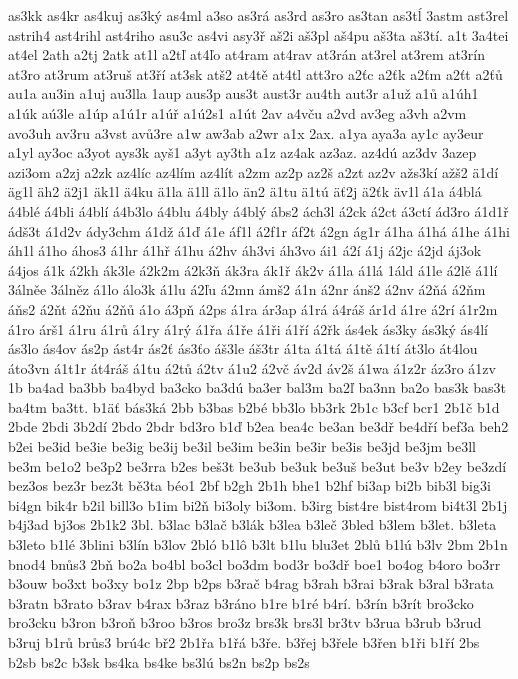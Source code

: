 {as3kk
as4kr
as4kuj
as3ký
as4ml
a3so
as3rá
as3rd
as3ro
as3tan
as3tĺ
3astm
ast3rel
astrih4
ast4rihl
ast4riho
asu3c
as4vi
asy3ř
aš2i
aš3pl
aš4pu
aš3ta
aš3tí.
a1t
3a4tei
at4el
2ath
a2tj
2atk
at1l
a2tľ
at4ľo
at4ram
at4rav
at3rán
at3rel
at3rem
at3rín
at3ro
at3rum
at3ruš
at3ří
at3sk
atš2
at4tě
at4tl
att3ro
a2ťc
a2ťk
a2ťm
a2ťt
a2ťů
au1a
au3in
a1uj
au3lla
1aup
aus3p
aus3t
aust3r
au4th
aut3r
a1už
a1ů
a1úh1
a1úk
aú3le
a1úp
a1ú1r
a1úř
a1ú2s1
a1út
2av
a4vču
a2vd
av3eg
a3vh
a2vm
avo3uh
av3ru
a3vst
avů3re
a1w
aw3ab
a2wr
a1x
2ax.
a1ya
aya3a
ay1c
ay3eur
a1yl
ay3oc
a3yot
ays3k
ayš1
a3yt
ay3th
a1z
az4ak
az3az.
az4dú
az3dv
3azep
azi3om
a2zj
a2zk
az4líc
az4lím
az4lít
a2zm
az2p
az2š
a2zt
az2v
ažs3kí
ažš2
ä1dí
äg1l
äh2
ä2j1
äk1l
ä4ku
ä1la
ä1ll
ä1lo
än2
ä1tu
ä1tú
äť2j
ä2ťk
äv1l
á1a
á4blá
á4blé
á4bli
á4blí
á4b3lo
á4blu
á4bly
á4blý
ábs2
ách3l
á2ck
á2ct
á3ctí
ád3ro
á1d1ř
ádš3t
á1d2v
ády3chm
á1dž
á1ď
á1e
áf1l
á2f1r
áf2t
á2gn
ág1r
á1ha
á1há
á1he
á1hi
áh1l
á1ho
áhos3
á1hr
á1hř
á1hu
á2hv
áh3vi
áh3vo
ái1
á2í
á1j
á2jc
á2jd
áj3ok
á4jos
á1k
á2kh
ák3le
á2k2m
á2k3ň
ák3ra
ák1ř
ák2v
á1la
á1lá
1áld
á1le
á2lě
á1lí
3álněe
3álněz
á1lo
álo3k
á1lu
á2ľu
á2mn
ámš2
á1n
á2nr
ánš2
á2nv
á2ňá
á2ňm
áňs2
á2ňt
á2ňu
á2ňů
á1o
á3pň
á2ps
á1ra
ár3ap
á1rá
á4ráš
ár1d
á1re
á2rí
á1r2m
á1ro
árš1
á1ru
á1rů
á1ry
á1rý
á1řa
á1ře
á1ři
á1ří
á2řk
ás4ek
ás3ky
ás3ký
ás4lí
ás3lo
ás4ov
ás2p
ást4r
ás2ť
ás3ťo
áš3le
áš3tr
á1ta
á1tá
á1tě
á1tí
át3lo
át4lou
áto3vn
á1t1r
át4ráš
á1tu
á2tů
á2tv
á1u2
á2vč
áv2d
áv2š
á1wa
á1z2r
áz3ro
á1zv
1b
ba4ad
ba3bb
ba4byd
ba3cko
ba3dú
ba3er
bal3m
ba2ľ
ba3nn
ba2o
bas3k
bas3t
ba4tm
ba3tt.
b1äť
bás3ká
2bb
b3bas
b2bé
bb3lo
bb3rk
2b1c
b3cf
bcr1
2b1č
b1d
2bde
2bdi
3b2dí
2bdo
2bdr
bd3ro
b1ď
b2ea
bea4c
be3an
be3dř
be4dří
bef3a
beh2
b2ei
be3id
be3ie
be3ig
be3ij
be3il
be3im
be3in
be3ir
be3is
be3jd
be3jm
be3ll
be3m
be1o2
be3p2
be3rra
b2es
beš3t
be3ub
be3uk
be3uš
be3ut
be3v
b2ey
be3zdí
bez3os
bez3r
bez3t
bě3ta
béo1
2bf
b2gh
2b1h
bhe1
b2hf
bi3ap
bi2b
bib3l
big3i
bi4gn
bik4r
b2il
bill3o
b1im
bi2ň
bi3oly
bi3om.
b3irg
bist4re
bist4rom
bi4t3l
2b1j
b4j3ad
bj3os
2b1k2
3bl.
b3lac
b3lač
b3lák
b3lea
b3leč
3bled
b3lem
b3let.
b3leta
b3leto
b1lé
3blini
b3lín
b3lov
2bló
b1lô
b3lt
b1lu
blu3et
2blů
b1lú
b3lv
2bm
2b1n
bnod4
bnůs3
2bň
bo2a
bo4bl
bo3cl
bo3dm
bod3r
bo3dř
boe1
bo4og
b4oro
bo3rr
b3ouw
bo3xt
bo3xy
bo1z
2bp
b2ps
b3rač
b4rag
b3rah
b3rai
b3rak
b3ral
b3rata
b3ratn
b3rato
b3rav
b4rax
b3raz
b3ráno
b1re
b1ré
b4rí.
b3rín
b3rít
bro3cko
bro3cku
b3ron
b3roň
b3roo
b3ros
bro3z
brs3k
brs3l
br3tv
b3rua
b3rub
b3rud
b3ruj
b1rů
brůs3
brú4c
bř2
2b1řa
b1řá
b3ře.
b3řej
b3řele
b3řen
b1ři
b1ří
2bs
b2sb
bs2c
b3sk
bs4ka
bs4ke
bs3lú
bs2n
bs2p
bs2s
}
